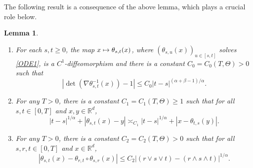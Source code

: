 \documentclass[JEP,XML,SOM,Unicode,published]{cedram}
\def\mto{\mathchoice{\longmapsto}{\mapsto}{\mapsto}{\mapsto}}
\theoremstyle{plain}
\newtheorem{lemma}[theorem]{Lemma}
\theoremstyle{definition}
\newcommand\mR{\mathbb{R}}
\newcommand\1{{\mathbf{1}}}
\begin{document}
The following result is a consequence of the above lemma, which plays a crucial role below.
\skpt
\begin{lemma}\label{Le22}
\begin{enumerate}
\item\label{Le22i}
For each $s,t\geq 0$, the map $x\mto \theta_{s,t}(x)$, where $(\theta_{s,u}(x))_{u\in [s,t]}$ solves \eqref{ODE1},
is a $C^1$-diffeomorphism and there is a constant $C_0=C_0(T,\Theta)>0$
such that
\[
|\det(\nabla\theta^{-1}_{s,t}(x))-1|\le C_0|t-s|^{(\alpha+\beta-1)/\alpha}.
\]
\item\label{Le22ii}
For any $T>0$, there is a constant $C_1=C_1(T,\Theta)\geq 1$
such that for all $s,t\in[0,T]$ and $x,y\in\mR^d$,
\begin{equation}\label{KH2}
|t-s|^{1/\alpha}+|\theta_{s,t}(x)-y|\asymp_{C_1}|t-s|^{1/\alpha}+|x-\theta_{t,s}(y)|.
\end{equation}
\item\label{Le22iii}
For any $T>0$, there is a constant $C_2=C_2(T,\Theta)>0$ such that for all $s,r,t\in[0,T]$ and $x\in\mR^d$,
\begin{equation}\label{KH1}
|\theta_{s,t}(x)-\theta_{r,t}\circ\theta_{s,r}(x)|\le C_2 |(r\vee s\vee t)-(r\wedge s\wedge t)|^{1/\alpha}.
\end{equation}
\end{enumerate}
\end{lemma}
\skpt
\end{document}
